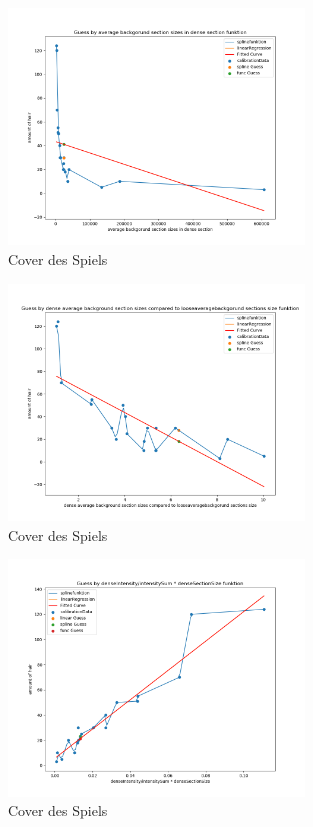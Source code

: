 \documentclass[german,a4paper, 12pt]{scrartcl}
\begin{document}
\begin{figure}
	\centering
	\includegraphics[width=0.7\textwidth]{figBina/g9.png}
	\caption[]{Cover des Spiels}
	\label{img:Bina01}
\end{figure}
\begin{figure}
	\centering
	\includegraphics[width=0.7\textwidth]{figBina/g10.png}
	\caption[]{Cover des Spiels}
	\label{img:Bina01}
\end{figure}
\begin{figure}
	\centering
	\includegraphics[width=0.7\textwidth]{figBina/g11.png}
	\caption[]{Cover des Spiels}
	\label{img:Bina01}
\end{figure}
\end{document}
